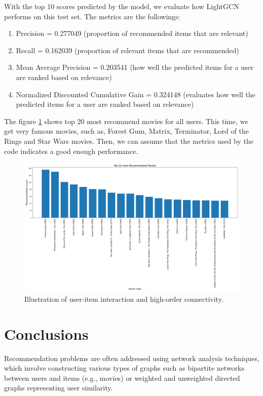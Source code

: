 \documentclass[12pt]{article}
\numberwithin{equation}{section}
\begin{document}
With the top 10 scores predicted by the model, we evaluate how LightGCN performs on this test set. The metrics are the followings:

\begin{enumerate}
	\item Precision = 0.277049 (proportion of recommended items that are relevant)
	\item Recall = 0.162039 (proportion of relevant items that are recommended)
	\item Mean Average Precision = 0.203541 (how well the predicted items for a user are ranked based on relevance)
	\item Normalized Discounted Cumulative Gain = 0.324148 (evaluates how well the predicted items for a user are ranked based on relevance)
\end{enumerate}

The figure \ref{fig:top_20_movies} shows top 20 most recommend movies for all users. This time, we get very famous movies, such as, Forest Gum, Matrix, Terminator, Lord of the Rings and Star Wars movies. Then, we can assume that the metrics used by the code indicates a good enough performance.


\begin{figure}[h]
	\centering
	\includegraphics[width=1\textwidth]{top_20_movies.png}
	\caption{Illustration of user-item interaction and high-order connectivity.}
	\label{fig:top_20_movies}
\end{figure}

\newpage
\section{Conclusions}

Recommendation problems are often addressed using network analysis techniques, which involve constructing various types of graphs such as bipartite networks between users and items (e.g., movies) or weighted and unweighted directed graphs representing user similarity.
\end{document}
